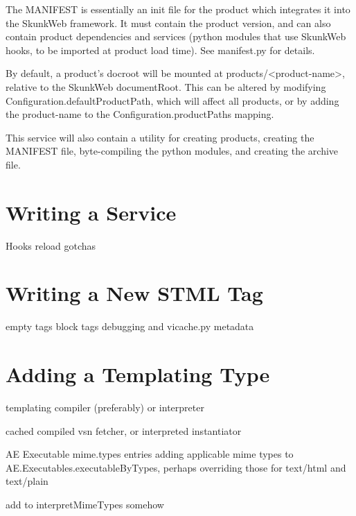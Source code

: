 \documentclass{manual}
\begin{document}
The MANIFEST is essentially an init file for the product which
integrates it into the SkunkWeb framework.  It must contain the
product version, and can also contain product dependencies and
services (python modules that use SkunkWeb hooks, to be imported at
product load time).  See manifest.py for details.

By default, a product's docroot will be mounted at
products/<product-name>, relative to the SkunkWeb documentRoot.  This
can be altered by modifying Configuration.defaultProductPath, which
will affect all products, or by adding the product-name to the
Configuration.productPaths mapping.

This service will also contain a utility for creating products, creating
the MANIFEST file, byte-compiling the python modules, and creating the
archive file.



\chapter{Writing a Service}
   Hooks
   reload gotchas

\chapter{Writing a New STML Tag}
   empty tags
   block tags
   debugging and vicache.py
   metadata

\chapter{Adding a Templating Type}
templating compiler (preferably) or interpreter

cached compiled vsn fetcher, or interpreted instantiator

AE Executable
mime.types entries
adding applicable mime types to AE.Executables.executableByTypes, perhaps overriding those for text/html and text/plain

add to interpretMimeTypes somehow
\end{document}
